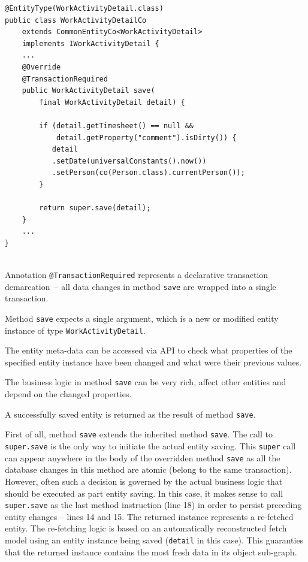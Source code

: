 \documentclass[a4paper,12pt,oneside,openright,final]{memoir} %
\begin{document}
	\medskip
	
	\begin{tcolorbox}[sidebyside, righthand width=0.3\textwidth, title=Example: simple \texttt{save} operation]
    \begin{lstlisting}[numbersep=2pt]
@EntityType(WorkActivityDetail.class)
public class WorkActivityDetailCo 
    extends CommonEntityCo<WorkActivityDetail> 
    implements IWorkActivityDetail {
    ...
    @Override
    @TransactionRequired
    public WorkActivityDetail save(
        final WorkActivityDetail detail) {
    
        if (detail.getTimesheet() == null && 
            detail.getProperty("comment").isDirty()) {
           detail
           .setDate(universalConstants().now())
           .setPerson(co(Person.class).currentPerson());
        }
    
        return super.save(detail);
    }
    ...
}    
	
	\end{lstlisting}
	\tcblower
		\tiny
		 Annotation \texttt{@TransactionRequired} represents a declarative transaction demarcation~-- all data changes in method \texttt{save} are wrapped into a single transaction.

		 \medskip
		 Method \texttt{save} expects a single argument, which is a new or modified entity instance of type \texttt{WorkActivityDetail}.

		 \medskip		 
		 The entity meta-data can be accessed via API to check what properties of the specified entity instance have been changed and what were their previous values.

		 \medskip		 
		 The business logic in method \texttt{save} can be very rich, affect other entities and depend on the changed properties.
		 
		 \medskip		 
		 A successfully saved entity is returned as the result of method \texttt{save}.
		 
 	\end{tcolorbox}	

	First of all, method \texttt{save} extends the inherited method \texttt{save}.
	The call to \texttt{super.save} is the only way to initiate the actual entity saving.
	This \texttt{super} call can appear anywhere in the body of the overridden method \texttt{save} as all the database changes in this method are atomic (belong to the same transaction).
	However, often such a decision is governed by the actual business logic that should be executed as part entity saving.
	In this case, it makes sense to call \texttt{super.save} as the last method instruction (line 18) in order to persist preceding entity changes -- lines 14 and 15.
	The returned instance represents a re-fetched entity.
	The re-fetching logic is based on an automatically reconstructed fetch model using an entity instance being saved (\texttt{detail} in this case).
	This guaranties that the returned instance contains the most fresh data in its object sub-graph.
	
\end{document}

